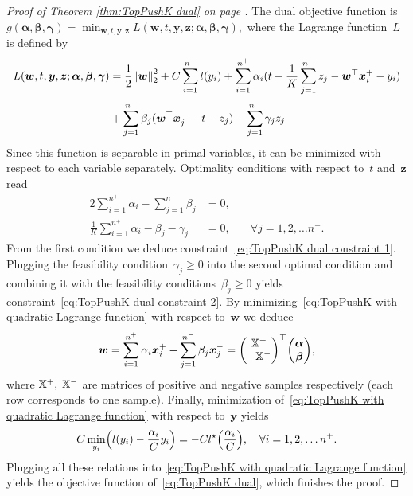 \begin{proof}[Proof of Theorem \ref{thm:TopPushK dual} on page \pageref{thm:TopPushK dual}]
  The dual objective function is~$g(\bm{\alpha}, \bm{\beta}, \bm{\gamma}) = \min_{\bm{w}, t, \bm{y}, \bm{z}} L(\bm{w}, t, \bm{y}, \bm{z}; \bm{\alpha}, \bm{\beta}, \bm{\gamma}),$ where the Lagrange function~$L$ is defined by
  \begin{equation}\label{eq:TopPushK with quadratic Lagrange function}
    \begin{aligned}
      L(\bm{w}, t, \bm{y}, \bm{z}; \bm{\alpha}, \bm{\beta}, \bm{\gamma})
      & = \frac{1}{2} \norm{\bm{w}}_{2}^{2}
        + C \sum_{i = 1}^{n^+} l(y_i)
        + \sum_{i = 1}^{n^+} \alpha_i(t + \frac{1}{K} \sum_{j = 1}^{n^-} z_j - \bm{w}^\top\bm{x}^+_i - y_i) \\ 
      & + \sum_{j = 1}^{n^-} \beta_j (\bm{w}^{\top}\bm{x}^-_j - t - z_j)
        - \sum_{j = 1}^{n^-} \gamma_j z_j
    \end{aligned}
  \end{equation}
  Since this function is separable in primal variables, it can be minimized with respect to each variable separately. Optimality conditions with respect to~$t$ and~$\bm{z}$ read
  \begin{alignat*}{2}
    \sum_{i = 1}^{n^+} \alpha_i - \sum_{j = 1}^{n^-} \beta_j     & = 0, \\
    \frac{1}{K} \sum_{i = 1}^{n^+} \alpha_i - \beta_j - \gamma_j & = 0, & \quad \forall j = 1, 2, \ldots n^-.
  \end{alignat*}
  From the first condition we deduce constraint~\eqref{eq:TopPushK dual constraint 1}. Plugging the feasibility condition~$\gamma_j \geq 0$ into the second optimal condition and combining it with the feasibility conditions~$\beta_j \geq 0$ yields constraint~\eqref{eq:TopPushK dual constraint 2}. By minimizing~\eqref{eq:TopPushK with quadratic Lagrange function} with respect to~$\bm{w}$ we deduce
  \begin{equation*}
    \bm{w}
        = \sum_{i = 1}^{n^+} \alpha_i \bm{x}^+_i - \sum_{j = 1}^{n^-} \beta_j \bm{x}^-_j
        = \Matrix{\X^+ \\ - \X^-}^\top \Matrix{\bm{\alpha} \\ \bm{\beta}},
  \end{equation*}
  where $\mathbb{X}^+,$ $\mathbb{X}^-$ are matrices of positive and negative samples respectively (each row corresponds to one sample). Finally, minimization of~\eqref{eq:TopPushK with quadratic Lagrange function} with respect to~$\bm{y}$ yields
  \begin{equation*}
    C \min_{y_i} \Brac{l(y_i) - \frac{\alpha_i}{C} y_i} = - C l^{\star} \Brac{\frac{\alpha_i}{C}}, \quad \forall i = 1, 2, \ldots n^+.
  \end{equation*}
  Plugging all these relations into~\eqref{eq:TopPushK with quadratic Lagrange function} yields the objective function of~\eqref{eq:TopPushK dual}, which finishes the proof.
\end{proof}

